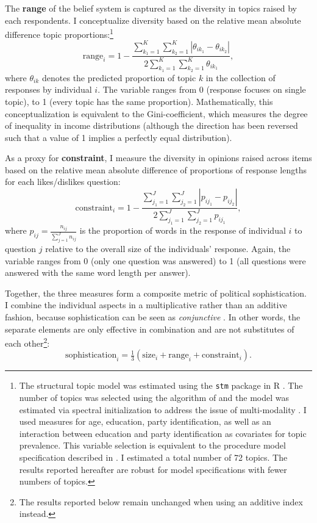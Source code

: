 \documentclass[12pt]{article}
\begin{document}
The \textbf{range} of the belief system is captured as the diversity in topics raised by each respondents. I conceptualize diversity based on the relative mean absolute difference topic proportions:\footnote{The structural topic model was estimated using the \texttt{stm} package in R \citep{roberts2014structural}. The number of topics was selected using the algorithm of \citet{lee2014low} and the model was estimated via spectral initialization to address the issue of multi-modality \citep[see][for details]{roberts2014stm}. I used measures for age, education, party identification, as well as an interaction between education and party identification as covariates for topic prevalence. This variable selection is equivalent to the procedure model specification described in \citet{roberts2014structural}. I estimated a total number of 72 topics. The results reported hereafter are robust for model specifications with fewer numbers of topics.}
\begin{equation}
\text{range}_i = 1-\dfrac{\sum_{k_1=1}^K\sum_{k_2=1}^K |\theta_{ik_1} - \theta_{ik_2}|}{2\sum_{k_1=1}^K\sum_{k_2=1}^K \theta_{ik_1}},
\end{equation}
where $\theta_{ik}$ denotes the predicted proportion of topic $k$ in the collection of responses by individual $i$. The variable ranges from 0 (response focuses on single topic), to 1 (every topic has the same proportion). Mathematically, this conceptualization is equivalent to the Gini-coefficient, which measures the degree of inequality in income distributions (although the direction has been reversed such that a value of 1 implies a perfectly equal distribution).

As a proxy for \textbf{constraint}, I measure the diversity in opinions raised across items based on the relative mean absolute difference of proportions of response lengths for each
likes/dislikes question:
\begin{equation}
\text{constraint}_i = 1-\dfrac{\sum_{j_1=1}^J\sum_{j_2=1}^J |p_{ij_1} - p_{ij_2}|}{2\sum_{j_1=1}^J\sum_{j_2=1}^J p_{ij_1}},
\end{equation}
where $p_{ij}=\tfrac{n_{ij}}{\sum_{j=1}^J n_{ij}}$ is the proportion of words in the response of individual $i$ to question $j$ relative to the overall size of the individuals' response. Again, the variable ranges from 0 (only one question was answered) to 1 (all questions were answered with the same word length per answer).

Together, the three measures form a composite metric of political sophistication. I combine the individual aspects in a multiplicative rather than an additive fashion, because sophistication can be seen as \textsl{conjunctive} \citep[see][]{luskin1987measuring}. In other words, the separate elements are only effective in combination and are not substitutes of each other\footnote{The results reported below remain unchanged when using an additive index instead.}:
\begin{equation}
\text{sophistication}_i = \tfrac{1}{3}(\text{size}_i + \text{range}_i + \text{constraint}_i).
\end{equation}
\end{document}
